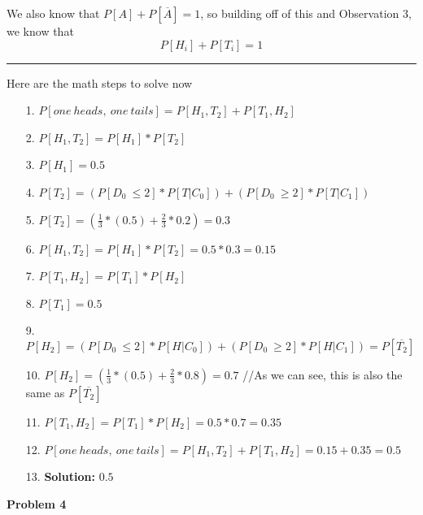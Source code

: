 \documentclass[11pt]{article}
\begin{document}
We also know that $P[A] + P[\overline{A}] = 1$, so building off of this and Observation 3, we know that
$$P[H_i] + P[T_i] = 1$$
\noindent\rule{20cm}{0.4pt}
Here are the math steps to solve now
\begin{enumerate}
\item[1. ] $P[one\ heads,\ one\ tails] = P[H_1,T_2] + P[T_1, H_2]$ \\
\item[2. ] $P[H_1, T_2] = P[H_1] * P[T_2]$\\
\item[3. ] $P[H_1] = 0.5$\\
\item[4. ] $P[T_2] = (P[D_0\ \leq 2] * P[T|C_0] ) + (P[D_0\ \geq 2] * P[T|C_1] )$\\
\item[5. ] $P[T_2] = (\frac{1}{3} * (0.5) + \frac{2}{3} * 0.2) = 0.3$\\
\item[6. ] $P[H_1, T_2] = P[H_1] * P[T_2] = 0.5 * 0.3 = 0.15$\\
\item[7. ] $P[T_1, H_2] = P[T_1] * P[H_2]$\\
\item[8. ] $P[T_1] = 0.5$\\
\item[9. ] $P[H_2] = (P[D_0\ \leq 2] * P[H|C_0] ) + (P[D_0\ \geq 2] * P[H|C_1] ) = P[\overline{T_2}]$\\
\item[10. ] $P[H_2] = (\frac{1}{3} * (0.5) + \frac{2}{3} * 0.8) = 0.7$ //As we can see, this is also the same as $P[\overline{T_2}]$\\
\item[11. ] $P[T_1, H_2] = P[T_1] * P[H_2] = 0.5 * 0.7 = 0.35$\\
\item[12. ] $P[one\ heads,\ one\ tails] = P[H_1,T_2] + P[T_1, H_2] = 0.15 + 0.35 = 0.5$\\
\item[13. ] {\Large \textbf{Solution: }$0.5$ }
\end{enumerate}
\newpage
\textbf{Problem 4}
\\
\end{document}
